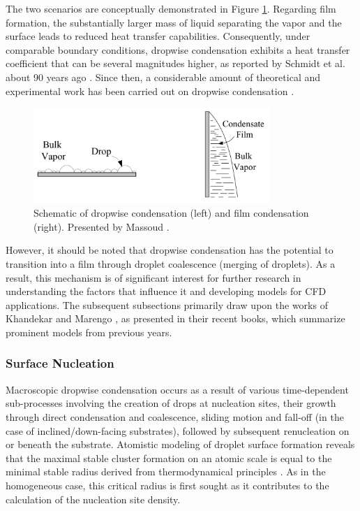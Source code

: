 \documentclass[12pt]{article}
\numberwithin{equation}{section}
\begin{document}
The two scenarios are conceptually demonstrated in Figure \ref{f:drop_vs_film}. Regarding film formation, the substantially larger mass of liquid separating the vapor and the surface leads to reduced heat transfer capabilities. Consequently, under comparable boundary conditions, dropwise condensation exhibits a heat transfer coefficient that can be several magnitudes higher, as reported by Schmidt et al. about 90 years ago \cite{schmidt1930versuche}. Since then, a considerable amount of theoretical and experimental work has been carried out on dropwise condensation \cite{liu2015dropwise}.  
\begin{figure}[H]
    \centering
    \includegraphics[width=0.8\textwidth]{Figures/Het_Cond_schematic.pdf}
    \caption{Schematic of dropwise condensation (left) and film condensation (right). Presented by Massoud \cite{massoud2005engineering}.}
    \label{f:drop_vs_film}
\end{figure}
However, it should be noted that dropwise condensation has the potential to transition into a film through droplet coalescence (merging of droplets). As a result, this mechanism is of significant interest for further research in understanding the factors that influence it and developing models for CFD applications. The subsequent subsections primarily draw upon the works of Khandekar \cite{khandekar2020drop} and Marengo \cite{marengo2022surface}, as presented in their recent books, which summarize prominent models from previous years. 
\subsubsection{Surface Nucleation}\label{sss:Literature-Heterogeneous-Nucleation}
Macroscopic dropwise condensation occurs as a result of various time-dependent sub-processes involving the creation of drops at nucleation sites, their growth through direct condensation and coalescence, sliding motion and fall-off (in the case of inclined/down-facing substrates), followed by subsequent renucleation on or beneath the substrate. Atomistic modeling of droplet surface formation reveals that the maximal stable cluster formation on an atomic scale is equal to the minimal stable radius derived from thermodynamical principles \cite{khandekar2020drop}. As in the homogeneous case, this critical radius is first sought as it contributes to the calculation of the nucleation site density.
\end{document}
